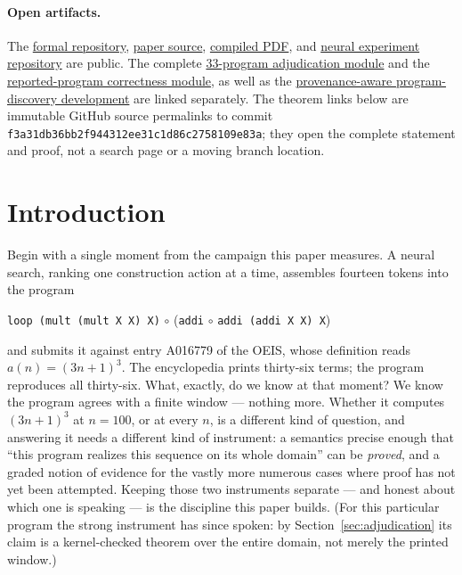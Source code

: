 \documentclass[11pt]{article}
\newcommand{\code}[1]{\texttt{#1}}
\newcommand{\formalcommit}{f3a31db36bb2f944312ee31c1d86c2758109e83a}
\begin{document}
\paragraph{Open artifacts.}
The \href{https://github.com/zariuq/MeTTapedia}{formal repository},
\href{https://github.com/zariuq/MeTTapedia/blob/main/papers/OEIS.tex}{paper source},
\href{https://github.com/zariuq/MeTTapedia/blob/main/papers/OEIS.pdf}{compiled PDF}, and
\href{https://github.com/zariuq/neuralnetworks}{neural experiment repository} are public.
The complete
\href{https://github.com/zariuq/MeTTapedia/blob/\formalcommit/lean/mettapedia/Mettapedia/GSLT/LanguageDef/Gauthier/Adjudications33.lean}{33-program adjudication module}
and the
\href{https://github.com/zariuq/MeTTapedia/blob/\formalcommit/lean/mettapedia/Mettapedia/GSLT/LanguageDef/Gauthier/ReportedSequencePrograms.lean}{reported-program correctness module},
as well as the
\href{https://github.com/zariuq/MeTTapedia/tree/\formalcommit/lean/mettapedia/Mettapedia/MachineLearning/SearchGuidance/ProgramDiscovery}{provenance-aware program-discovery development}
are linked separately. The theorem links below are immutable GitHub source permalinks to
commit \code{\formalcommit}; they open the complete statement and proof, not a search page
or a moving branch location.

\section{Introduction}

Begin with a single moment from the campaign this paper measures. A neural search,
ranking one construction action at a time, assembles fourteen tokens into the program
\begin{center}
\code{loop (mult (mult X X) X)} $\circ$ (\code{addi} $\circ$ \code{addi (addi X X) X})
\end{center}
and submits it against entry A016779 of the OEIS, whose definition reads
$a(n)=(3n+1)^3$. The encyclopedia prints thirty-six terms; the program reproduces all
thirty-six. What,
exactly, do we know at that moment? We know the program agrees with a finite window ---
nothing more. Whether it computes $(3n+1)^3$ at $n=100$, or at every $n$, is a different
kind of question, and answering it needs a different kind of instrument: a semantics
precise enough that ``this program realizes this sequence on its whole domain'' can be
\emph{proved}, and a graded notion of evidence for the vastly more numerous cases where
proof has not yet been attempted. Keeping those two instruments separate --- and honest
about which one is speaking --- is the discipline this paper builds. (For this
particular program the strong instrument has since spoken: by
Section~\ref{sec:adjudication} its claim is a kernel-checked theorem over the entire
domain, not merely the printed window.)
\end{document}
